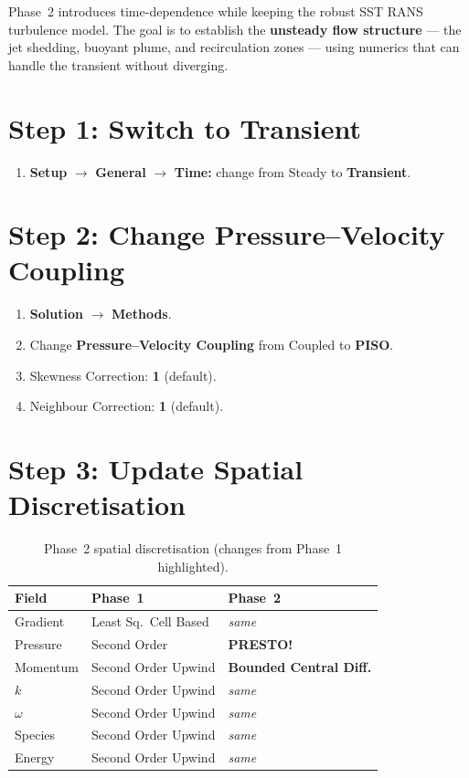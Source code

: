 \documentclass[12pt,a4paper]{report}
\begin{document}
Phase~2 introduces time-dependence while keeping the robust SST RANS
turbulence model.  The goal is to establish the \textbf{unsteady flow
structure} --- the jet shedding, buoyant plume, and recirculation
zones --- using numerics that can handle the transient without
diverging.


\section{Step 1: Switch to Transient}

\begin{enumerate}
  \item \textbf{Setup} $\rightarrow$ \textbf{General} $\rightarrow$
        \textbf{Time:} change from Steady to \textbf{Transient}.
\end{enumerate}

\noindent{}


\section{Step 2: Change Pressure--Velocity Coupling}

\begin{enumerate}
  \item \textbf{Solution} $\rightarrow$ \textbf{Methods}.
  \item Change \textbf{Pressure--Velocity Coupling} from Coupled to
        \textbf{PISO}.
  \item Skewness Correction: \textbf{1} (default).
  \item Neighbour Correction: \textbf{1} (default).
\end{enumerate}


\section{Step 3: Update Spatial Discretisation}

\begin{table}[H]
\centering
\caption{Phase~2 spatial discretisation (changes from Phase~1
         highlighted).}
\begin{tabular}{@{}lll@{}}
\toprule
\textbf{Field} & \textbf{Phase~1} & \textbf{Phase~2} \\
\midrule
Gradient   & Least Sq.\ Cell Based & \emph{same} \\
Pressure   & Second Order          & \textbf{PRESTO!} \\
Momentum   & Second Order Upwind   & \textbf{Bounded Central Diff.} \\
$k$        & Second Order Upwind   & \emph{same} \\
$\omega$   & Second Order Upwind   & \emph{same} \\
Species    & Second Order Upwind   & \emph{same} \\
Energy     & Second Order Upwind   & \emph{same} \\
\bottomrule
\end{tabular}
\end{table}
\end{document}

